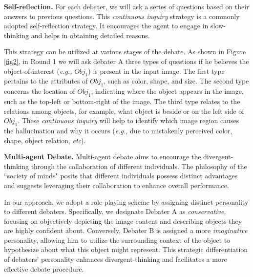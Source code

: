 \documentclass[10pt,twocolumn,letterpaper]{article}
\begin{document}
\noindent\textbf{Self-reflection.} For each debater, we will ask a series of questions based on their answers to previous questions. This \emph{continuous inquiry} strategy is a commonly adopted self-reflection strategy. It encourages the agent to engage in slow-thinking and helps in obtaining detailed reasons. 

This strategy can be utilized at various stages of the debate.
As shown in Figure \ref{fig2}, in Round 1 we will ask debater A three types of questions if he believes the object-of-interest (\emph{e.g.,} $Obj_1$) is present in the input image. The first type pertains to the attributes of $Obj_1$, such as color, shape, and size. The second type concerns the location of $Obj_1$, indicating where the object appears in the image, such as the top-left or bottom-right of the image. The third type relates to the relations among objects, for example, what object is beside or on the left side of $Obj_1$. These \emph{continuous inquiry} will help to identify which image region causes the hallucination and why it occurs (\emph{e.g.,} due to mistakenly perceived color, shape, object relation, \emph{etc}).





\noindent\textbf{Multi-agent Debate.} 
Multi-agent debate aims to encourage the divergent-thinking through the collaboration of different individuals. The philosophy of the ``society of minds" posits that different individuals possess distinct advantages and suggests leveraging their collaboration to enhance overall performance.


In our approach, we adopt a role-playing scheme by assigning distinct personality to different debaters. Specifically, we designate Debater A as \emph{conservative}, focusing on objectively depicting the image content and describing objects they are highly confident about. Conversely, Debater B is assigned a more \emph{imaginative} personality, allowing him to utilize the surrounding context of the object to hypothesize about what this object might represent. This strategic differentiation of debaters’ personality enhances divergent-thinking and facilitates a more effective debate procedure.
\end{document}
